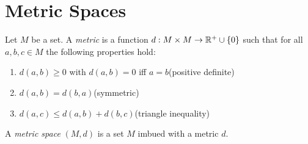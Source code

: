 \documentclass[letterpaper,12pt,fleqn]{article}
\begin{document}
\section*{Metric Spaces}

\begin{definition}[Metric]
  Let \(M\) be a set.  A \emph{metric} is a function \(d:M\times M\to\mathbb{R}^+\cup\{0\}\) such that for all \(a,b,c\in
  M\) the following properties hold:
  \begin{enumerate}
  \item \(d(a,b)\ge0\) with \(d(a,b)=0\) iff \(a=b\)\qquad(positive definite)
  \item \(d(a,b)=d(b,a)\)\qquad(symmetric)
  \item \(d(a,c)\le d(a,b)+d(b,c)\)\qquad(triangle inequality)
  \end{enumerate}
\end{definition}

\begin{definition}
  A \emph{metric space} \((M,d)\) is a set \(M\) imbued with a metric \(d\).
\end{definition}
\end{document}
